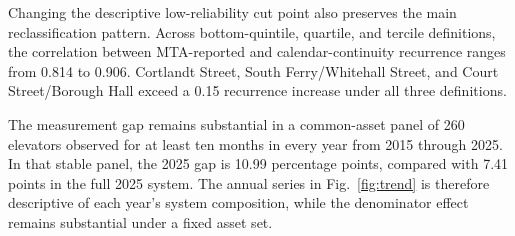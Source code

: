 Changing the descriptive low-reliability cut point also preserves the main reclassification pattern. Across bottom-quintile, quartile, and tercile definitions, the correlation between MTA-reported and calendar-continuity recurrence ranges from 0.814 to 0.906. Cortlandt Street, South Ferry/Whitehall Street, and Court Street/Borough Hall exceed a 0.15 recurrence increase under all three definitions.

The measurement gap remains substantial in a common-asset panel of 260 elevators observed for at least ten months in every year from 2015 through 2025. In that stable panel, the 2025 gap is 10.99 percentage points, compared with 7.41 points in the full 2025 system. The annual series in Fig.~\ref{fig:trend} is therefore descriptive of each year's system composition, while the denominator effect remains substantial under a fixed asset set.
